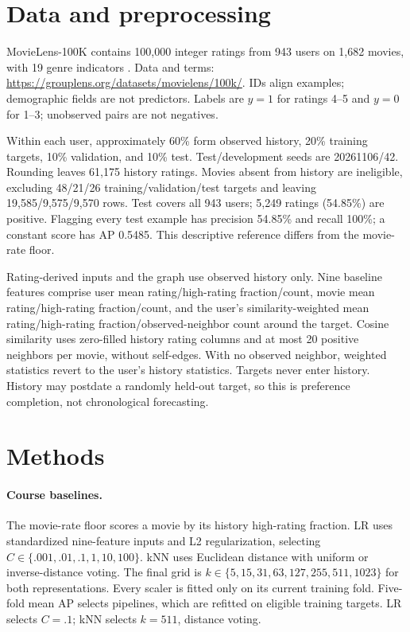 \documentclass{article}
\begin{document}
\clearpage
\section{Data and preprocessing}
MovieLens-100K contains 100,000 integer ratings from 943 users on 1,682 movies, with 19 genre indicators \citep{harper2015}. Data and terms: \url{https://grouplens.org/datasets/movielens/100k/}. IDs align examples; demographic fields are not predictors. Labels are $y=1$ for ratings 4--5 and $y=0$ for 1--3; unobserved pairs are not negatives.

Within each user, approximately 60\% form observed history, 20\% training targets, 10\% validation, and 10\% test. Test/development seeds are 20261106/42. Rounding leaves 61,175 history ratings. Movies absent from history are ineligible, excluding 48/21/26 training/validation/test targets and leaving 19,585/9,575/9,570 rows. Test covers all 943 users; 5,249 ratings (54.85\%) are positive. Flagging every test example has precision 54.85\% and recall 100\%; a constant score has AP 0.5485. This descriptive reference differs from the movie-rate floor.

Rating-derived inputs and the graph use observed history only. Nine baseline features comprise user mean rating/high-rating fraction/count, movie mean rating/high-rating fraction/count, and the user's similarity-weighted mean rating/high-rating fraction/observed-neighbor count around the target. Cosine similarity uses zero-filled history rating columns and at most 20 positive neighbors per movie, without self-edges. With no observed neighbor, weighted statistics revert to the user's history statistics. Targets never enter history. History may postdate a randomly held-out target, so this is preference completion, not chronological forecasting.

\section{Methods}
\paragraph{Course baselines.}
The movie-rate floor scores a movie by its history high-rating fraction. LR uses standardized nine-feature inputs and L2 regularization, selecting $C\in\{.001,.01,.1,1,10,100\}$. kNN uses Euclidean distance with uniform or inverse-distance voting. The final grid is $k\in\{5,15,31,63,127,255,511,1023\}$ for both representations. Every scaler is fitted only on its current training fold. Five-fold mean AP selects pipelines, which are refitted on eligible training targets. LR selects $C=.1$; kNN selects $k=511$, distance voting.
\end{document}
